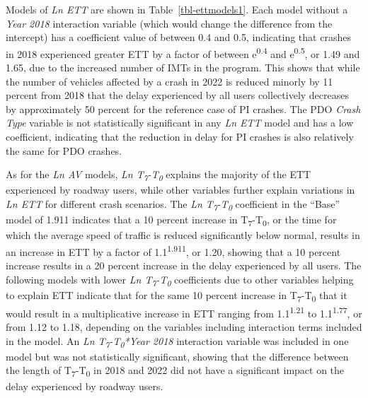 \documentclass[
  letterpaper,
  authoryear]{elsarticle}
\begin{document}
Models of \emph{Ln ETT} are shown in Table~\ref{tbl-ettmodels1}. Each
model without a \emph{Year 2018} interaction variable (which would
change the difference from the intercept) has a coefficient value of
between 0.4 and 0.5, indicating that crashes in 2018 experienced greater
ETT by a factor of between e\textsuperscript{0.4} and
e\textsuperscript{0.5}, or 1.49 and 1.65, due to the increased number of
IMTs in the program. This shows that while the number of vehicles
affected by a crash in 2022 is reduced minorly by 11 percent from 2018
that the delay experienced by all users collectively decreases by
approximately 50 percent for the reference case of PI crashes. The PDO
\emph{Crash Type} variable is not statistically significant in any
\emph{Ln ETT} model and has a low coefficient, indicating that the
reduction in delay for PI crashes is also relatively the same for PDO
crashes.

As for the \emph{Ln AV} models, \emph{Ln
T\textsubscript{7}-T\textsubscript{0}} explains the majority of the ETT
experienced by roadway users, while other variables further explain
variations in \emph{Ln ETT} for different crash scenarios. The \emph{Ln
T\textsubscript{7}-T\textsubscript{0}} coefficient in the ``Base'' model
of 1.911 indicates that a 10 percent increase in
T\textsubscript{7}-T\textsubscript{0}, or the time for which the average
speed of traffic is reduced significantly below normal, results in an
increase in ETT by a factor of 1.1\textsuperscript{1.911}, or 1.20,
showing that a 10 percent increase results in a 20 percent increase in
the delay experienced by all users. The following models with lower
\emph{Ln T\textsubscript{7}-T\textsubscript{0}} coefficients due to
other variables helping to explain ETT indicate that for the same 10
percent increase in T\textsubscript{7}-T\textsubscript{0} that it would
result in a multiplicative increase in ETT ranging from
1.1\textsuperscript{1.21} to 1.1\textsuperscript{1.77}, or from 1.12 to
1.18, depending on the variables including interaction terms included in
the model. An \emph{Ln T\textsubscript{7}-T\textsubscript{0}*Year 2018}
interaction variable was included in one model but was not statistically
significant, showing that the difference between the length of
T\textsubscript{7}-T\textsubscript{0} in 2018 and 2022 did not have a
significant impact on the delay experienced by roadway users.
\end{document}
